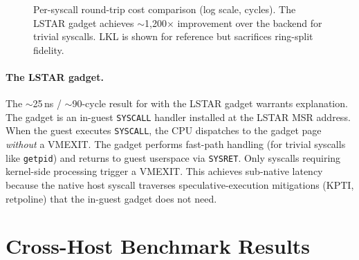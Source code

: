 \begin{figure}[htbp]
\centering
{}
\caption{Per-syscall round-trip cost comparison (log scale, cycles).
  The LSTAR gadget achieves $\sim$1,200$\times$ improvement over
  the \Seccomp{} backend for trivial syscalls.  LKL is shown for
  reference but sacrifices ring-split fidelity.}
\label{fig:syscall-cycles}
\end{figure}

\paragraph{The LSTAR gadget.}
The $\sim$25\,ns / $\sim$90-cycle result for \KVMvTwo{} with the
LSTAR gadget warrants explanation.  The gadget is an in-guest
\texttt{SYSCALL} handler installed at the LSTAR MSR address.  When
the guest executes \texttt{SYSCALL}, the CPU dispatches to the
gadget page \emph{without} a VMEXIT.  The gadget performs fast-path
handling (for trivial syscalls like \texttt{getpid}) and returns to
guest userspace via \texttt{SYSRET}.  Only syscalls requiring
kernel-side processing trigger a VMEXIT.  This achieves sub-native
latency because the native host syscall traverses speculative-execution
mitigations (KPTI, retpoline) that the in-guest gadget does not need.


\section{Cross-Host Benchmark Results}
\label{sec:bench-crosshost}

